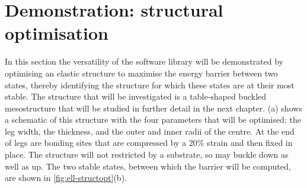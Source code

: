 



\section{Demonstration: structural optimisation}\label{sec:ell-demo}
In this section the versatility of the software library will be demonstrated by optimising an elastic structure to maximise the energy barrier between two states, thereby identifying the structure for which these states are at their most stable.
The structure that will be investigated is a table-shaped buckled mesostructure that will be studied in further detail in the next chapter.
(a) shows a schematic of this structure with the four parameters that will be optimised: the leg width, the thickness, and the outer and inner radii of the centre.
At the end of legs are bonding sites that are compressed by a 20\% strain and then fixed in place.
The structure will not restricted by a substrate, so may buckle down as well as up.
The two stable states, between which the barrier will be computed, are shown in \cref{fig:ell-structopt}(b).


